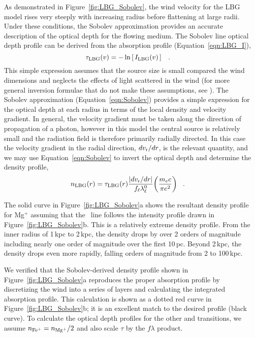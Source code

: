 \documentclass[12pt,preprint]{aastex}
\begin{document}
As demonstrated in Figure~\ref{fig:LBG_Sobolev}, the wind velocity for
the LBG model rises very steeply with increasing radius before
flattening at large radii.  Under these conditions, the Sobolev
approximation provides an accurate description of the optical depth
for the flowing medium. 
The Sobolev line optical depth profile can be derived from
the absorption profile (Equation~\ref{eqn:LBG_I}), 
\begin{equation}
\tau_{\rm LBG}(v) = -\ln \left [ \, I_{\rm LBG}(v) \, \right ] \;\;\; .
\label{eqn:tauLBG}
\end{equation}
This simple expression assumes that the source size is small compared the wind dimensions
and neglects the effects of light scattered in the wind (for more general inversion
formulae that do not make these assumptions, see \citet{Kasen_2002}).
The Sobolev approximation (Equation~\ref{eqn:Sobolev}) provides a simple expression for the optical
depth at each radius in terms of the local density and velocity gradient.  In general, the velocity 
 gradient must be taken along the direction of propagation of a photon, however
in this model the central source is relatively small  and the radiation
field is therefore primarily radially directed.  In this 
case the velocity gradient in the radial direction, $dv_{\rm r}/dr$, is the relevant quantity, and 
we may use Equation~\ref{eqn:Sobolev}  to invert
the optical depth and determine the density profile,
\begin{equation}
n_{\rm LBG}(r) =  \tau_{\rm LBG}(r)  \frac{ |dv_{\rm r}/dr |}{f_\ell  \lambda^0_\ell}
\biggl( \frac{ m_e c}{\pi e^2} \biggl)
 \;\;\; .
\label{eqn:nSobolev}
\end{equation}


The solid curve in Figure~\ref{fig:LBG_Sobolev}a shows the
resultant density profile for Mg$^+$ assuming that the \mgiia\ line
follows the intensity profile drawn in Figure~\ref{fig:LBG_Sobolev}b. 
This is a relatively extreme density profile.  From the inner radius
of 1\,kpc to 2\,kpc, the density drops by over 2 orders of
magnitude including nearly one order of magnitude over the first
10\,pc.  Beyond 2\,kpc, the density drops even more rapidly, falling
orders of magnitude from 2 to 100\,kpc.

We verified that the Sobolev-derived density profile shown in
Figure~\ref{fig:LBG_Sobolev}a
reproduces the proper
absorption profile by discretizing the wind into a series of layers
and calculating the integrated absorption profile.  This
calculation is shown as a dotted red curve in
Figure~\ref{fig:LBG_Sobolev}b; it is an excellent
match to the desired profile (black curve).
To calculate the optical depth profiles for the other  and
 transitions, we
assume $n_{\rm Fe^+} = n_{\rm Mg^+}/2$ and also scale $\tau$ by the $f\lambda$ product.
\end{document}
